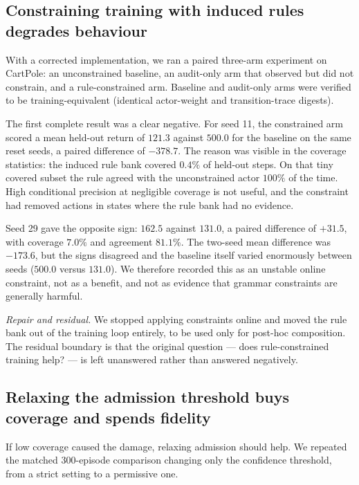\documentclass[11pt,a4paper]{article}
\begin{document}
\subsection{Constraining training with induced rules degrades behaviour}
\label{sec:hist-constrain}

With a corrected implementation, we ran a paired three-arm experiment on CartPole: an unconstrained baseline, an audit-only arm that observed but did not constrain, and a rule-constrained arm. Baseline and audit-only arms were verified to be training-equivalent (identical actor-weight and transition-trace digests).

The first complete result was a clear negative. For seed 11, the constrained arm scored a mean held-out return of $121.3$ against $500.0$ for the baseline on the same reset seeds, a paired difference of $-378.7$. The reason was visible in the coverage statistics: the induced rule bank covered $0.4\%$ of held-out steps. On that tiny covered subset the rule agreed with the unconstrained actor $100\%$ of the time. High conditional precision at negligible coverage is not useful, and the constraint had removed actions in states where the rule bank had no evidence.

Seed 29 gave the opposite sign: $162.5$ against $131.0$, a paired difference of $+31.5$, with coverage $7.0\%$ and agreement $81.1\%$. The two-seed mean difference was $-173.6$, but the signs disagreed and the baseline itself varied enormously between seeds ($500.0$ versus $131.0$). We therefore recorded this as an unstable online constraint, not as a benefit, and not as evidence that grammar constraints are generally harmful.

\emph{Repair and residual.} We stopped applying constraints online and moved the rule bank out of the training loop entirely, to be used only for post-hoc composition. The residual boundary is that the original question --- does rule-constrained training help? --- is left unanswered rather than answered negatively.

\subsection{Relaxing the admission threshold buys coverage and spends fidelity}
\label{sec:hist-threshold}

If low coverage caused the damage, relaxing admission should help. We repeated the matched 300-episode comparison changing only the confidence threshold, from a strict setting to a permissive one.
\end{document}
